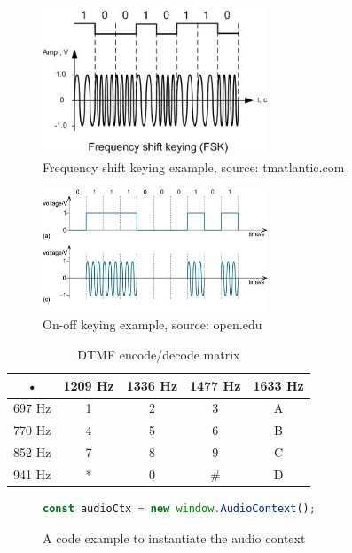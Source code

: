 \documentclass[twocolumn,14pt]{extarticle}
\begin{document}
\begin{figure}[!ht]
\begin{center}
\includegraphics[width=0.6\textwidth]{figure/fsk.jpg}
\caption{Frequency shift keying example, source: tmatlantic.com}
\label{appendix:fig:fsk}
\end{center}
\end{figure}

\begin{figure}[!ht]
\begin{center}
\includegraphics[width=0.6\textwidth]{figure/ook.png}
\caption{On-off keying example, source: open.edu}
\label{appendix:fig:ook}
\end{center}
\end{figure}

\begin{table}[p]
  \centering
\begin{tabular}{|c|c|c|c|c|}
\hline 
• & 1209 Hz & 1336 Hz & 1477 Hz & 1633 Hz \\ 
\hline 
697 Hz & 1 & 2 & 3 & A \\ 
\hline 
770 Hz & 4 & 5 & 6 & B \\ 
\hline 
852 Hz & 7 & 8 & 9 & C \\ 
\hline 
941 Hz & * & 0 & \# & D \\ 
\hline 
\end{tabular}
\caption{DTMF encode/decode matrix}
\label{appendix:table:dtmf}
\end{table}

\begin{figure}[!ht]
\begin{lstlisting}[language=JavaScript]
const audioCtx = new window.AudioContext();
\end{lstlisting}
\caption{A code example to instantiate the audio context}
\label{appendix:fig:audioctxinstance}
\end{figure}
\end{document}
